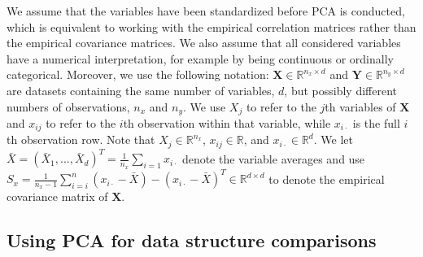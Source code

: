 \documentclass[a4paper,12pt]{article}
\newcommand{\RR}{\mathbb{R}}
\begin{document}
We assume that the variables have been standardized before PCA is conducted, which is equivalent to working with the empirical correlation matrices rather than the empirical covariance matrices. We also assume that all considered variables have a numerical interpretation, for example by being continuous or ordinally categorical. Moreover, we use the following notation: 
$\mathbf{X} \in \RR^{n_x \times d} $ and $\mathbf{Y} \in \RR^{n_y \times d} $ are datasets containing the same number of variables, $d$, but possibly different numbers of observations, $n_x$ and $n_y$. We use $X_j$ to refer to the $j$th variables of $\mathbf{X}$ and $x_{ij}$ to refer to the $i$th observation  within that variable, while $x_{i \cdot}$ is the full $i$th observation row. Note that $X_j \in \RR^{n_x}$, $x_{ij} \in \RR$, and $x_{i \cdot} \in \RR^d$. We let $\bar{X} = (\bar{X}_1, ... , \bar{X}_d)^T = \frac{1}{n_x} \sum_{i = 1} x_{i \cdot}$ denote the variable averages and use $S_x =  \frac{1}{n_x - 1} \sum_{i = i}^n (x_{i \cdot} - \bar{X}) - (x_{i \cdot} - \bar{X})^T \in \RR^{d \times d}$ to denote the empirical covariance matrix of $\mathbf{X}$. 



\subsection*{Using PCA for data structure comparisons}
\end{document}
